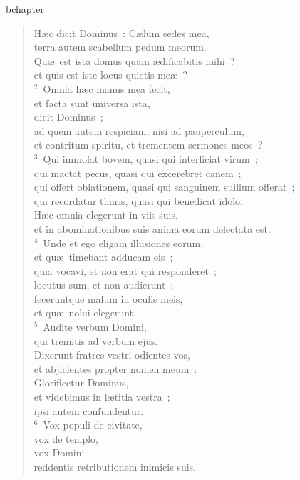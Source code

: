 bchapter\begin{verse}\vspace{-19pt}H\ae c dicit Dominus~: C\ae lum sedes mea,\\ terra autem scabellum pedum meorum.\\ Qu\ae\ est ista domus quam \ae dificabitis mihi~?\\ et quis est iste locus quietis me\ae~?\\
${}^{2}$~Omnia h\ae c manus mea fecit,\\ et facta sunt universa ista,\\ dicit Dominus~;\\ ad quem autem respiciam, nisi ad pauperculum,\\ et contritum spiritu, et trementem sermones meos~?\\
${}^{3}$~Qui immolat bovem, quasi qui interficiat virum~;\\ qui mactat pecus, quasi qui excerebret canem~;\\ qui offert oblationem, quasi qui sanguinem suillum offerat~;\\ qui recordatur thuris, quasi qui benedicat idolo.\\ H\ae c omnia elegerunt in viis suis,\\ et in abominationibus suis anima eorum delectata est.\\
${}^{4}$~Unde et ego eligam illusiones eorum,\\ et qu\ae\ timebant adducam eis~;\\ quia vocavi, et non erat qui responderet~;\\ locutus sum, et non audierunt~;\\ feceruntque malum in oculis meis,\\ et qu\ae\ nolui elegerunt.\\
${}^{5}$~Audite verbum Domini,\\ qui tremitis ad verbum ejus.\\ Dixerunt fratres vestri odientes vos,\\ et abjicientes propter nomen meum~:\\ Glorificetur Dominus,\\ et videbimus in l\ae titia vestra~;\\ ipsi autem confundentur.\\
${}^{6}$~Vox populi de civitate,\\ vox de templo,\\ vox Domini\\ reddentis retributionem inimicis suis.\\

\end{verse}
